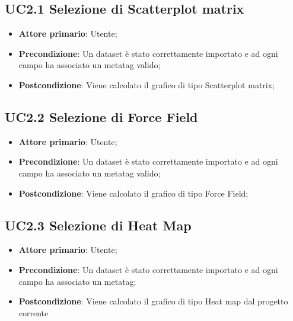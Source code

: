 \subsection{UC2.1 Selezione di Scatterplot matrix}

\begin{itemize}

    \item \textbf{Attore primario}: Utente;

    \item \textbf{Precondizione}:   Un dataset è stato correttamente importato e ad ogni campo ha associato
                                    un metatag valido;

    \item \textbf{Postcondizione}:  Viene calcolato il grafico di tipo Scatterplot matrix;
  
\end{itemize}


\subsection{UC2.2 Selezione di Force Field}

\begin{itemize}

    \item \textbf{Attore primario}: Utente;

    \item \textbf{Precondizione}:   Un dataset è stato correttamente importato e ad ogni campo ha associato
                                    un metatag valido;

    \item \textbf{Postcondizione}:  Viene calcolato il grafico di tipo Force Field;
  
\end{itemize}


\subsection{UC2.3 Selezione di Heat Map}

\begin{itemize}

    \item \textbf{Attore primario}: Utente;

    \item \textbf{Precondizione}:   Un dataset è stato correttamente importato e ad ogni campo ha associato
                                    un metatag;

    \item \textbf{Postcondizione}:  Viene calcolato il grafico di tipo Heat map dal progetto corrente
  
\end{itemize}


